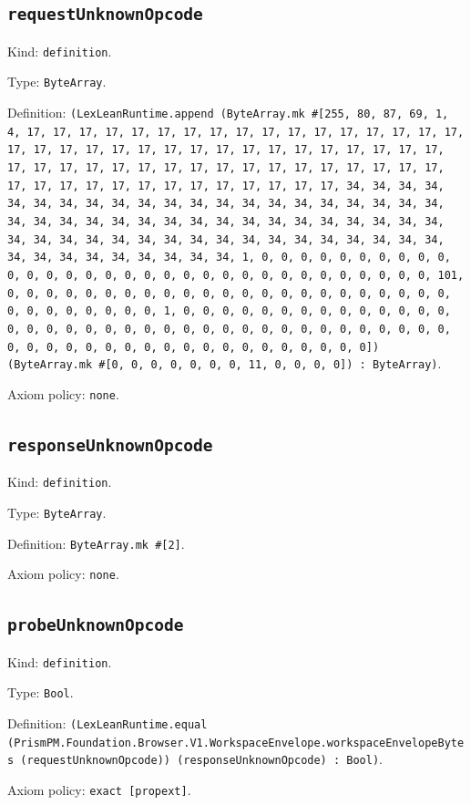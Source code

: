 \documentclass[11pt]{article}
\begin{document}
\subsection*{\texttt{requestUnknownOpcode}}
\noindent Kind: \texttt{definition}.\par
\noindent Type: \texttt{ByteArray}.\par
\noindent Definition: \texttt{(LexLeanRuntime.append (ByteArray.mk \#[255, 80, 87, 69, 1, 4, 17, 17, 17, 17, 17, 17, 17, 17, 17, 17, 17, 17, 17, 17, 17, 17, 17, 17, 17, 17, 17, 17, 17, 17, 17, 17, 17, 17, 17, 17, 17, 17, 17, 17, 17, 17, 17, 17, 17, 17, 17, 17, 17, 17, 17, 17, 17, 17, 17, 17, 17, 17, 17, 17, 17, 17, 17, 17, 17, 17, 17, 17, 17, 17, 34, 34, 34, 34, 34, 34, 34, 34, 34, 34, 34, 34, 34, 34, 34, 34, 34, 34, 34, 34, 34, 34, 34, 34, 34, 34, 34, 34, 34, 34, 34, 34, 34, 34, 34, 34, 34, 34, 34, 34, 34, 34, 34, 34, 34, 34, 34, 34, 34, 34, 34, 34, 34, 34, 34, 34, 34, 34, 34, 34, 34, 34, 34, 34, 1, 0, 0, 0, 0, 0, 0, 0, 0, 0, 0, 0, 0, 0, 0, 0, 0, 0, 0, 0, 0, 0, 0, 0, 0, 0, 0, 0, 0, 0, 0, 0, 0, 101, 0, 0, 0, 0, 0, 0, 0, 0, 0, 0, 0, 0, 0, 0, 0, 0, 0, 0, 0, 0, 0, 0, 0, 0, 0, 0, 0, 0, 0, 0, 0, 1, 0, 0, 0, 0, 0, 0, 0, 0, 0, 0, 0, 0, 0, 0, 0, 0, 0, 0, 0, 0, 0, 0, 0, 0, 0, 0, 0, 0, 0, 0, 0, 0, 0, 0, 0, 0, 0, 0, 0, 0, 0, 0, 0, 0, 0, 0, 0, 0, 0, 0, 0, 0, 0, 0, 0, 0]) (ByteArray.mk \#[0, 0, 0, 0, 0, 0, 0, 11, 0, 0, 0, 0]) : ByteArray)}.\par
\noindent Axiom policy: \texttt{none}.\par
\subsection*{\texttt{responseUnknownOpcode}}
\noindent Kind: \texttt{definition}.\par
\noindent Type: \texttt{ByteArray}.\par
\noindent Definition: \texttt{ByteArray.mk \#[2]}.\par
\noindent Axiom policy: \texttt{none}.\par
\subsection*{\texttt{probeUnknownOpcode}}
\noindent Kind: \texttt{definition}.\par
\noindent Type: \texttt{Bool}.\par
\noindent Definition: \texttt{(LexLeanRuntime.equal (PrismPM.Foundation.Browser.V1.WorkspaceEnvelope.workspaceEnvelopeBytes (requestUnknownOpcode)) (responseUnknownOpcode) : Bool)}.\par
\noindent Axiom policy: \texttt{exact [propext]}.\par
\end{document}
